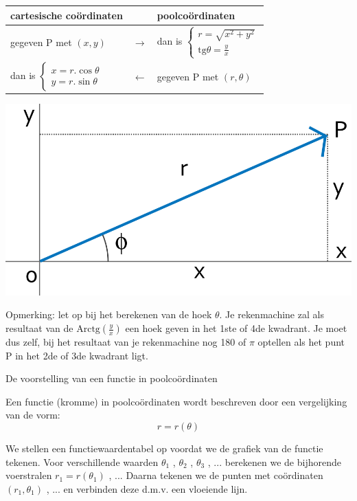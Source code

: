 \begin{minipage}{.48\linewidth}
	\begin{tabular}{|l|c|l|}
		\hline 
		cartesische co\"ordinaten &  & poolco\"ordinaten  \\
		\hline
		gegeven P met $\left(x,y\right)$ & $\rightarrow$ & dan is $\begin{cases}
		r=\sqrt{x^{2}+y^{2}}\\
		\textrm{tg}\theta=\frac{y}{x}
		\end{cases}$  \\
		dan is $\begin{cases}
		x=r.\cos\theta\\
		y=r.\sin\theta
		\end{cases}$ & $\leftarrow$ & gegeven P met $\left(r,\theta\right)$ \\
		\hline 
	\end{tabular}
\end{minipage}
\hspace{1cm}
\begin{minipage}{.48\linewidth}
	\centering
	\includegraphics[width=0.7\linewidth]{2_elem_rekenvaardigheden_B/inputs/figuur9}
\end{minipage}


Opmerking: let op bij het berekenen van de hoek $\theta$. Je rekenmachine
zal als resultaat van de $\textrm{Arctg}\left(\frac{y}{x}\right)$
een hoek geven in het 1ste of 4de kwadrant. Je moet dus zelf, bij
het resultaat van je rekenmachine nog 180\textdegree{} of $\pi$ optellen
als het punt P in het 2de of 3de kwadrant ligt.

\noindent De voorstelling van een functie in poolco\"ordinaten

\noindent Een functie (kromme) in poolco\"ordinaten wordt beschreven
door een vergelijking van de vorm:
\[
r=r(\theta)
\]


\noindent We stellen een functiewaardentabel op voordat we de grafiek
van de functie tekenen. Voor verschillende waarden $\theta_{1}$ ,
$\theta_{2}$ , $\theta_{3}$ , ... berekenen we de bijhorende voerstralen
$r_{1}=r\left(\theta_{1}\right)$ , ... Daarna tekenen we de punten
met co\"ordinaten $\left(r_{1},\theta_{1}\right)$ , ... en verbinden
deze d.m.v. een vloeiende lijn.


